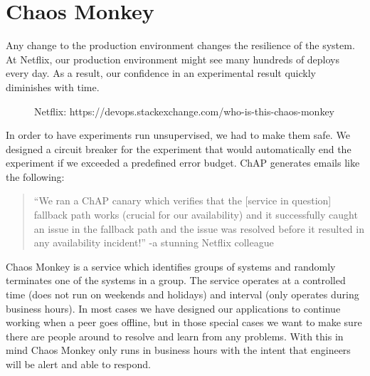 \documentclass[9pt,twocolumn,twoside]{optica-suppl-materials}
\begin{document}
\section*{Chaos Monkey}
Any change to the production environment changes the resilience of the system. At Netflix, our production environment might see many hundreds of deploys every day. As a result, our confidence in an experimental result quickly diminishes with time.
\begin{figure}[htbp]
\centering
{}
\caption{Netflix: https://devops.stackexchange.com/who-is-this-chaos-monkey}
\label{fig:false-color}
\end{figure}
In order to have experiments run unsupervised, we had to make them safe. We designed a circuit breaker for the experiment that would automatically end the experiment if we exceeded a predefined error budget. 
ChAP generates emails like the following:
\begin{quote}
    “We ran a ChAP canary which verifies that the [service in question] fallback path works (crucial for our availability) and it successfully caught an issue in the fallback path and the issue was resolved before it resulted in any availability incident!”
-a stunning Netflix colleague
\end{quote}
Chaos Monkey is a service which identifies groups of systems and randomly terminates one of the systems in a group. The service operates at a controlled time (does not run on weekends and holidays) and interval (only operates during business hours). In most cases we have designed our applications to continue working when a peer goes offline, but in those special cases we want to make sure there are people around to resolve and learn from any problems. With this in mind Chaos Monkey only runs in business hours with the intent that engineers will be alert and able to respond.
\end{document}

